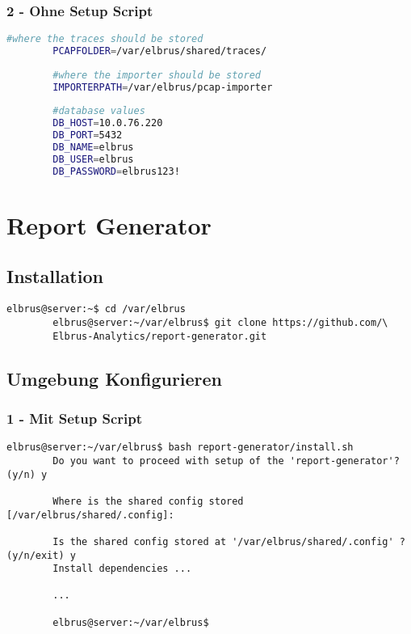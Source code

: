 \documentclass{article}
\begin{document}
	\newpage
	\subsubsection{2 - Ohne Setup Script}	
	
	\lstset{style=files}
	\begin{lstlisting}[caption={pcap-importer/.env - Anpassen an eigene Werte.}, language=bash]
		#where the traces should be stored
		PCAPFOLDER=/var/elbrus/shared/traces/
		
		#where the importer should be stored
		IMPORTERPATH=/var/elbrus/pcap-importer
		
		#database values
		DB_HOST=10.0.76.220
		DB_PORT=5432
		DB_NAME=elbrus
		DB_USER=elbrus
		DB_PASSWORD=elbrus123!
	\end{lstlisting}
	\newpage
	
	\section{Report Generator}
	\lstset{style=commands}
	\subsection{Installation}
	\begin{lstlisting}[caption={Clonen der Software von GitHub.}]
		elbrus@server:~$ cd /var/elbrus
		elbrus@server:~/var/elbrus$ git clone https://github.com/\
		Elbrus-Analytics/report-generator.git
	\end{lstlisting}

	\subsection[file config]{Umgebung Konfigurieren}
	
	\subsubsection{1 - Mit Setup Script}
	
	\begin{lstlisting}[caption={Ausführen des 'install.sh' Scripts.}]
		elbrus@server:~/var/elbrus$ bash report-generator/install.sh
		Do you want to proceed with setup of the 'report-generator'? (y/n) y
		
		Where is the shared config stored [/var/elbrus/shared/.config]:
		
		Is the shared config stored at '/var/elbrus/shared/.config' ? (y/n/exit) y
		Install dependencies ...
		
		...
		
		elbrus@server:~/var/elbrus$
	\end{lstlisting}
	
\end{document}
